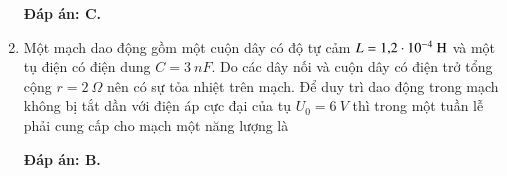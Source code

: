 \begin{enumerate}[label=\bfseries Câu \arabic*:]
	\hideall
	{		\textbf{Đáp án: C.}
		
		
		
	}
	\item {}
	
	{
		Một mạch dao động gồm một cuộn dây có độ tự cảm $L = \text{1,2} \cdot 10^{-4}\ \text H$ và một tụ điện có điện dung $C = \SI{3}{nF}$. Do các dây nối và cuộn dây có điện trở tổng cộng $r = \SI{2}{\Omega}$ nên có sự tỏa nhiệt trên mạch. Để duy trì dao động trong mạch không bị tắt dần với điện áp cực đại của tụ $U_0 =\SI{6}{V}$ thì trong một tuần lễ phải cung cấp cho mạch một năng lượng là
		
		
	}
	
	\hideall
	{		\textbf{Đáp án: B.}
		
		
		
	}
\end{enumerate}
